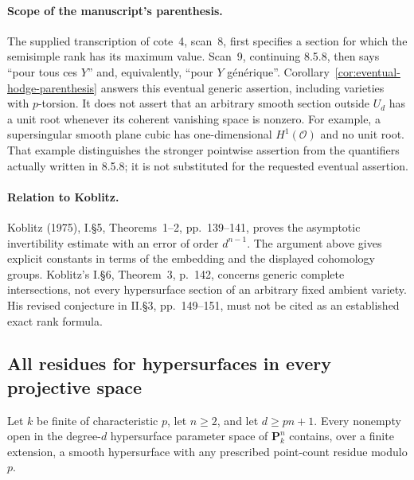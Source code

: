 \paragraph{Scope of the manuscript's parenthesis.}
The supplied transcription of cote~4, scan~8, first specifies a
section for which the semisimple rank has its maximum value.  Scan~9,
continuing 8.5.8, then says ``pour tous ces $Y$'' and, equivalently,
``pour $Y$ g\'en\'erique''.  Corollary~\ref{cor:eventual-hodge-parenthesis}
answers this eventual generic assertion, including varieties with
$p$-torsion.  It does not assert that an arbitrary smooth section
outside $U_d$ has a unit root whenever its coherent vanishing space
is nonzero.  For example, a supersingular smooth plane cubic has
one-dimensional $H^1(\mathcal O)$ and no unit root.  That example
distinguishes the stronger pointwise assertion from the quantifiers
actually written in 8.5.8; it is not substituted for the requested
eventual assertion.

\paragraph{Relation to Koblitz.}
Koblitz (1975), I.\S5, Theorems~1--2, pp.~139--141, proves the
asymptotic invertibility estimate with an error of order $d^{n-1}$.
The argument above gives explicit constants in terms of the embedding
and the displayed cohomology groups.  Koblitz's I.\S6, Theorem~3,
p.~142, concerns generic complete intersections, not every hypersurface
section of an arbitrary fixed ambient variety.  His revised conjecture
in II.\S3, pp.~149--151, must not be cited as an established exact rank
formula.

\subsection{All residues for hypersurfaces in every projective space}

\begin{theorem}\label{thm:projective-all-residues}
Let $k$ be finite of characteristic $p$, let $n\geq2$, and let
$d\geq pn+1$.  Every nonempty open in the degree-$d$ hypersurface
parameter space of $\mathbf P^n_k$ contains, over a finite extension,
a smooth hypersurface with any prescribed point-count residue
modulo $p$.
\end{theorem}

